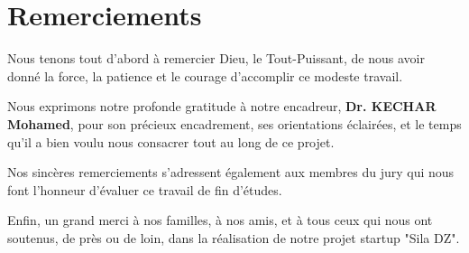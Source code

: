 \chapter*{Remerciements}

Nous tenons tout d'abord à remercier Dieu, le Tout-Puissant, de nous avoir donné la force, la patience et le courage d'accomplir ce modeste travail.

Nous exprimons notre profonde gratitude à notre encadreur, \textbf{Dr. KECHAR Mohamed}, pour son précieux encadrement, ses orientations éclairées, et le temps qu'il a bien voulu nous consacrer tout au long de ce projet.

Nos sincères remerciements s'adressent également aux membres du jury qui nous font l'honneur d'évaluer ce travail de fin d'études.

Enfin, un grand merci à nos familles, à nos amis, et à tous ceux qui nous ont soutenus, de près ou de loin, dans la réalisation de notre projet startup "Sila DZ".
